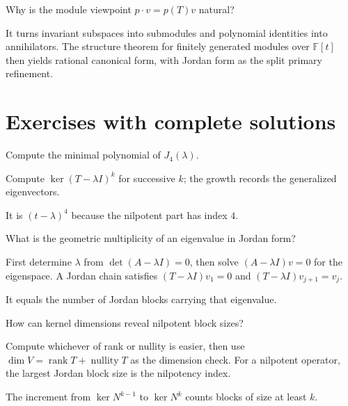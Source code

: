 \begin{problem}\label{prob:i12-problem-12}
Why is the module viewpoint $p\cdot v=p(T)v$ natural?
\end{problem}
\begin{solution}
It turns invariant subspaces into submodules and polynomial identities into annihilators. The structure theorem for finitely generated modules over $\mathbb F[t]$ then yields rational canonical form, with Jordan form as the split primary refinement.
\end{solution}


\section{Exercises with complete solutions}

\begin{exercise}\label{exr:i12-01}
Compute the minimal polynomial of $J_4(\lambda)$.
\end{exercise}
\begin{hint}
Compute \(\ker(T-\lambda I)^k\) for successive \(k\); the growth records the generalized eigenvectors.
\end{hint}
\begin{solution}
It is $(t-\lambda)^4$ because the nilpotent part has index $4$.
\end{solution}

\begin{exercise}\label{exr:i12-02}
What is the geometric multiplicity of an eigenvalue in Jordan form?
\end{exercise}
\begin{hint}
First determine \(\lambda\) from \(\det(A-\lambda I)=0\), then solve \((A-\lambda I)v=0\) for the eigenspace. A Jordan chain satisfies \((T-\lambda I)v_1=0\) and \((T-\lambda I)v_{j+1}=v_j\).
\end{hint}
\begin{solution}
It equals the number of Jordan blocks carrying that eigenvalue.
\end{solution}

\begin{exercise}\label{exr:i12-03}
How can kernel dimensions reveal nilpotent block sizes?
\end{exercise}
\begin{hint}
Compute whichever of rank or nullity is easier, then use \(\dim V=\operatorname{rank}T+\operatorname{nullity}T\) as the dimension check. For a nilpotent operator, the largest Jordan block size is the nilpotency index.
\end{hint}
\begin{solution}
The increment from $\ker N^{k-1}$ to $\ker N^k$ counts blocks of size at least $k$.
\end{solution}

